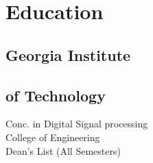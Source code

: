 \documentclass[a4paper]{deedy-resume-openfont} %
\begin{document}
\begin{minipage}[t]{0.33\textwidth} %


\section{Education}

\subsection{Georgia Institute}
\subsection{of Technology}


Conc. in Digital Signal processing \\
College of Engineering \\
Dean's List (All Semesters) \\








\end{minipage}
\end{document}

